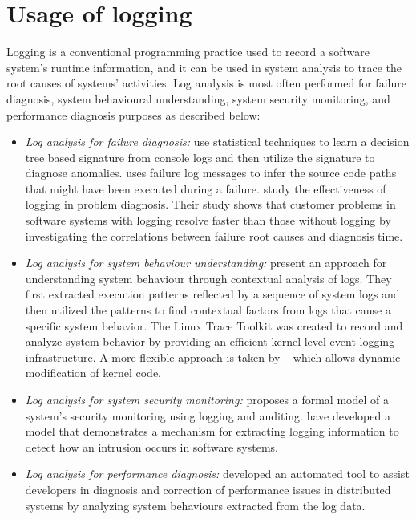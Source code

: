 \section{Usage of logging}  \label{logging}
Logging is a conventional programming practice used to record a software system's runtime information, and it can be used in system analysis to trace the root causes of systems' activities. Log analysis is most often performed for failure diagnosis, system behavioural understanding, system security monitoring, and performance diagnosis purposes as described below:
\begin{itemize} [leftmargin=0.5in]
\item \emph{Log analysis for failure diagnosis:} \citet{xu2009detecting} use statistical techniques to learn a decision tree based signature from console logs and then utilize the signature to diagnose anomalies.  \cite{yuan2010sherlog} uses failure log messages to infer the source code paths that might have been executed during a failure. \citet{jiang2009understanding} study the effectiveness of logging in problem diagnosis. Their study shows that customer problems in software systems with logging resolve faster than those without logging by investigating the correlations between failure root causes and diagnosis time.
\item \emph{Log analysis for system behaviour understanding:} \citet{fu2013contextual} present an approach for understanding system behaviour through contextual analysis of logs. They first extracted execution patterns reflected by a sequence of system logs and then utilized the patterns to find contextual factors from logs that cause a specific system behavior. The Linux Trace Toolkit \cite{yaghmour2000measuringandcharacter} was created to record and analyze system behavior by providing an efficient kernel-level event logging infrastructure. A more flexible approach is taken by ~\cite{cantrill2004dynamic} which allows dynamic modification of kernel code.
\item \emph{Log analysis for system security monitoring:} \citet{bishop1989model} proposes a formal model of a system's security monitoring using logging and auditing. \citet{peisert2007toward} have developed a model that demonstrates a mechanism for extracting logging information to detect how an intrusion occurs in software systems.
\item \emph{Log analysis for performance diagnosis:} \citet{nagaraj2012structured} developed an automated tool to assist developers in diagnosis and correction of performance issues in distributed systems by analyzing system behaviours extracted from the log data.
\end{itemize}



